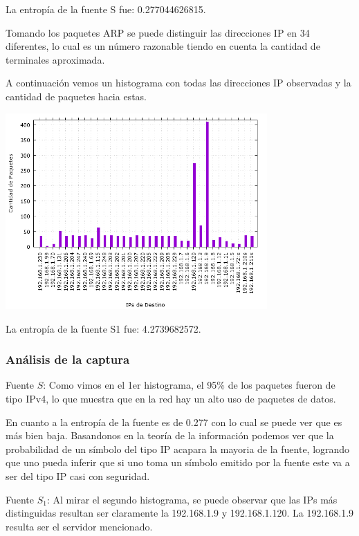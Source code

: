 La entrop\'ia de la fuente S fue: 0.277044626815.\newline

Tomando los paquetes ARP se puede distinguir las direcciones IP en 34 diferentes, lo cual es un número razonable tiendo en cuenta la cantidad de terminales aproximada.

A continuación vemos un histograma con todas las direcciones IP observadas y la cantidad de paquetes hacia estas.

\begin{center}
\includegraphics[width=0.75\textwidth]{exp2-graficos/grafico2exp2.png}
\end{center}

La entrop\'ia de la fuente S1 fue: 4.2739682572.


\subsubsection{An\'alisis de la captura}
Fuente $S$:
Como vimos en el 1er histograma, el 95\% de los paquetes fueron de tipo IPv4, lo que muestra que en la red hay un alto uso de paquetes de datos.

En cuanto a la entropía de la fuente es de 0.277 con lo cual se
puede ver que es más bien baja. Basandonos en la teoría de la información podemos ver que la probabilidad de un símbolo del tipo IP acapara la mayoria de la fuente, logrando que uno pueda inferir que si uno toma un símbolo emitido por la fuente este va a ser del tipo IP casi con seguridad.

Fuente $S_{1}$:
Al mirar el segundo histograma, se puede observar que las IPs más distinguidas resultan ser claramente la 192.168.1.9 y 192.168.1.120. La 192.168.1.9 resulta ser el servidor mencionado.


